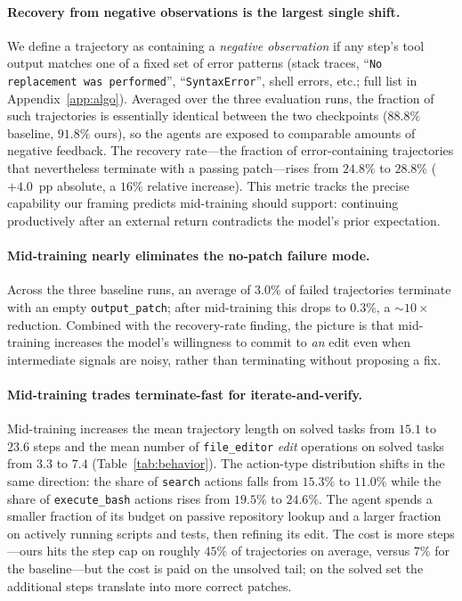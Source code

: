\paragraph{Recovery from negative observations is the largest single shift.}
We define a trajectory as containing a \emph{negative observation} if any
step's tool output matches one of a fixed set of error patterns
(stack traces, ``\texttt{No replacement was performed}'',
``\texttt{SyntaxError}'', shell errors, etc.; full list in
Appendix~\ref{app:algo}). Averaged over the three evaluation runs, the
fraction of such trajectories is essentially identical between the two
checkpoints ($88.8\%$ baseline, $91.8\%$ ours), so the agents are exposed to
comparable amounts of negative feedback. The recovery rate---the fraction
of error-containing trajectories that nevertheless terminate with a passing
patch---rises from $24.8\%$ to $28.8\%$ ($+4.0$~pp absolute, a $16\%$
relative increase). This metric tracks the precise capability our framing
predicts mid-training should support: continuing productively after an
external return contradicts the model's prior expectation.

\paragraph{Mid-training nearly eliminates the no-patch failure mode.}
Across the three baseline runs, an average of $3.0\%$ of failed trajectories
terminate with an empty \texttt{output\_patch}; after mid-training this
drops to $0.3\%$, a $\sim 10\times$ reduction. Combined with the
recovery-rate finding, the picture is that mid-training increases the
model's willingness to commit to \emph{an} edit even when intermediate
signals are noisy, rather than terminating without proposing a fix.

\paragraph{Mid-training trades terminate-fast for iterate-and-verify.}
Mid-training increases the mean trajectory length on solved tasks from
$15.1$ to $23.6$ steps and the mean number of \texttt{file\_editor}
\emph{edit} operations on solved tasks from $3.3$ to $7.4$
(Table~\ref{tab:behavior}). The action-type distribution shifts in the same
direction: the share of \texttt{search} actions falls from $15.3\%$ to
$11.0\%$ while the share of \texttt{execute\_bash} actions rises from
$19.5\%$ to $24.6\%$. The agent spends a smaller fraction of its budget on
passive repository lookup and a larger fraction on actively running scripts
and tests, then refining its edit. The cost is more steps---ours hits the
step cap on roughly $45\%$ of trajectories on average, versus $7\%$ for the
baseline---but the cost is paid on the unsolved tail; on the solved set the
additional steps translate into more correct patches.

